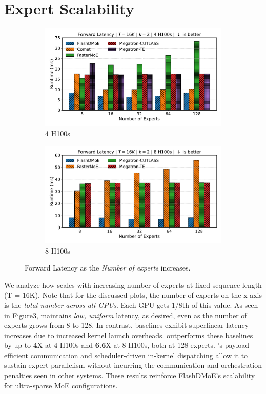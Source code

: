 \section{Expert Scalability}\label{sec:expert-scalability}
\begin{figure}[!h]
    \centering
    \begin{subfigure}{0.49\textwidth}
        \centering
        \includegraphics[width=\linewidth, keepaspectratio]{figures/scaling_experts}
        \caption{4 H100s}
        \label{sub:4gx}
    \end{subfigure}
    \begin{subfigure}{0.49\textwidth}
        \centering
        \includegraphics[width=\linewidth, keepaspectratio]{figures/scaling_experts_8}
        \caption{8 H100s}
        \label{sub:8gx}
    \end{subfigure}
    \caption{Forward Latency as the \emph{Number of experts} increases.}
    \label{fig:xs}
\end{figure}
We analyze how \sysname scales with increasing number of experts at fixed sequence length (T = 16K).
Note that for the discussed plots, the number of experts on the x-axis is the \emph{total number across all GPUs}.
Each GPU gets 1/8th of this value.
As seen in Figure\ref{fig:xs}, \sysname maintains \emph{low, uniform} latency, as desired,
even as the number of experts grows from 8 to 128.
In contrast, baselines exhibit superlinear latency increases due to increased kernel launch overheads.
\sysname outperforms these baselines by up to \textbf{4}X at 4 H100s and \textbf{6.6}X at 8 H100s, both at 128 experts.
\sysname’s payload-efficient communication and scheduler-driven
in-kernel dispatching allow it to sustain expert parallelism
without incurring the communication and orchestration penalties seen in other systems.
These results reinforce FlashDMoE’s scalability for ultra-sparse MoE configurations.
